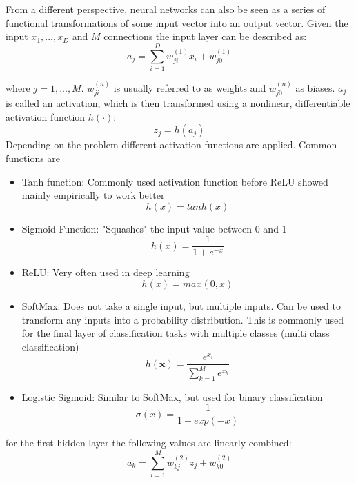 \documentclass[draft,final,oneside]{vutinfth} %
\begin{document}
From a different perspective, neural networks can also be seen as a series of functional transformations of some input vector into an output vector. Given the input $x_1, ..., x_D$ and $M$ connections the input layer can be described as:
\begin{equation}
a_j = \sum_{i=1}^{D} w_{ji}^{(1)}x_i + w_{j0}^{(1)}
\end{equation}

where $j = 1, ..., M$. $w_{ji}^{(n)}$ is usually referred to as weights and $w_{j0}^{(n)}$ as biases. $a_j$ is called an activation, which is then transformed using a nonlinear, differentiable activation function $h(\cdot)$:
\begin{equation}
z_j = h(a_j)
\end{equation}
Depending on the problem different activation functions are applied. Common functions are
\begin{itemize}
\item Tanh function: Commonly used activation function before ReLU showed mainly empirically to work better
\begin{equation}
h(x) = tanh(x)
\end{equation}
\item Sigmoid Function: "Squashes" the input value between 0 and 1
\begin{equation}
h(x) = \dfrac {1} {1 + e^{-x}}
\end{equation}
\item ReLU: Very often used in deep learning
\begin{equation}
h(x) = max(0, x)
\end{equation}
\item SoftMax: Does not take a single input, but multiple inputs. Can be used to transform any inputs into a probability distribution. This is commonly used for the final layer of classification tasks with multiple classes (multi class classification)
\begin{equation}
h(\boldsymbol{x}) = \dfrac{e^{x_i}}{\sum_{k=1}^{M} e^{x_k}}
\end{equation}
\item Logistic Sigmoid: Similar to SoftMax, but used for binary classification
\begin{equation}
\sigma(x) = \dfrac{1}{1 + exp(-x)}
\end{equation}
\end{itemize}


for the first hidden layer the following values are linearly combined:
\begin{equation}
a_k = \sum_{i=1}^{M} w_{kj}^{(2)}z_j + w_{k0}^{(2)}
\end{equation}
\end{document}
